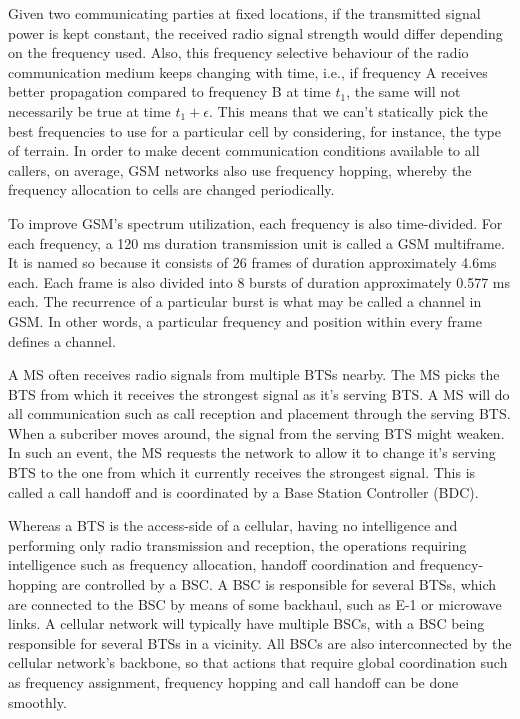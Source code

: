 Given two communicating parties at fixed locations, if the transmitted signal power is kept constant, the received radio signal strength would differ depending on the frequency used. Also, this frequency selective behaviour of the radio communication medium keeps changing with time, i.e., if frequency A receives better propagation compared to frequency B at time $t_1$, the same will not necessarily be true at time $t_1+\epsilon$. This means that we can't statically pick the best frequencies to use for a particular cell by considering, for instance, the type of terrain. In order to make decent communication conditions available to all callers, on average, GSM networks also use frequency hopping, whereby the frequency allocation to cells are changed periodically. 

To improve GSM's spectrum utilization, each frequency is also time-divided. For each frequency, a 120 ms duration transmission unit is called a GSM multiframe. It is named so because it consists of 26 frames of duration approximately 4.6ms each. Each frame is also divided into 8 bursts of duration approximately 0.577 ms each. The recurrence of a particular burst is what may be called a channel in GSM. In other words, a particular frequency and position within every frame defines a channel.

A MS often receives radio signals from multiple BTSs nearby. The MS picks the BTS from which it receives the strongest signal as it's serving BTS. A MS will do all communication such as call reception and placement through the serving BTS. When a subcriber moves around, the signal from the serving BTS might weaken. In such an event, the MS requests the network to allow it to change it's serving BTS to the one from which it currently receives the strongest signal. This is called a call handoff and is coordinated by a Base Station Controller (BDC).

Whereas a BTS is the access-side of a cellular, having no intelligence and performing only radio transmission and reception, the operations requiring intelligence such as frequency allocation, handoff coordination and frequency-hopping are controlled by a BSC. A BSC is responsible for several BTSs, which are connected to the BSC by means of some backhaul, such as E-1 or microwave links. A cellular network will typically have multiple BSCs, with a BSC being responsible for several BTSs in a vicinity. All BSCs are also interconnected by the cellular network's backbone, so that actions that require global coordination such as frequency assignment, frequency hopping and call handoff can be done smoothly.

